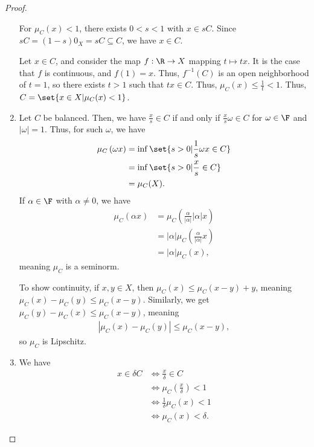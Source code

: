 \documentclass[10pt]{mypackage}
\begin{document}
\begin{proof}
\begin{enumerate}[(1)]
      For $\mu_{C}(x) < 1$, there exists $0 < s < 1$ with $x\in sC$. Since $sC = \left(1-s\right)0_X = sC \subseteq C$, we have $x\in C$.\newline

      Let $x\in C$, and consider the map $f: \R\rightarrow X$ mapping $t\mapsto tx$. It is the case that $f$ is continuous, and $f(1) = x$. Thus, $f^{-1}(C)$ is an open neighborhood of $t=1$, so there exists $t > 1$ such that $tx\in C$. Thus, $\mu_{C}(x) \leq \frac{1}{t} < 1$. Thus, $C = \set{x\in X| \mu_{C}(x) < 1}$.
    \item Let $C$ be balanced. Then, we have $\frac{x}{s}\in C$ if and only if $\frac{x}{s}\omega \in C$ for $\omega \in \F$ and $\left\vert \omega \right\vert = 1$. Thus, for such $\omega$, we have
      \begin{align*}
        \mu_{C}\left(\omega x\right) &= \inf\set{s > 0 | \frac{1}{s}\omega x \in C}\\
                                     &= \inf\set{s > 0 | \frac{x}{s}\in C}\\
                                     &= \mu_{C}(X).
      \end{align*}
      If $\alpha \in \F$ with $\alpha \neq 0$, we have
      \begin{align*}
        \mu_{C}\left(\alpha x\right) &= \mu_{C}\left(\frac{\alpha}{\left\vert \alpha \right\vert} \left\vert \alpha \right\vert x\right)\\
        &= \left\vert \alpha \right\vert \mu_{C}\left(\frac{\alpha}{\left\vert \alpha \right\vert} x\right)\\
        &= \left\vert \alpha \right\vert \mu_{C}\left(x\right),
      \end{align*}
      meaning $\mu_{C}$ is a seminorm.\newline

      To show continuity, if $x,y\in X$, then $\mu_{C}(x) \leq \mu_{C}(x-y) + y$, meaning $\mu_{C}\left(x\right) - \mu_{C}\left(y\right) \leq \mu_{C}\left(x-y\right)$. Similarly, we get $\mu_{C}(y) - \mu_{C}(x) \leq \mu_{C}\left(x-y\right)$, meaning
      \begin{align*}
        \left\vert \mu_{C}\left(x\right) - \mu_{C}\left(y\right) \right\vert \leq \mu_{C}\left(x-y\right),
      \end{align*}
      so $\mu_{C}$ is Lipschitz.
    \item We have
      \begin{align*}
        x\in \delta C &\Leftrightarrow \frac{x}{\delta}\in C\\
                      &\Leftrightarrow \mu_{C}\left(\frac{x}{\delta}\right) < 1\\
                      &\Leftrightarrow \frac{1}{\delta}\mu_{C}(x) < 1\\
                      &\Leftrightarrow \mu_{C}\left(x\right) < \delta.
      \end{align*}
  \end{enumerate}
\end{proof}
\end{document}
